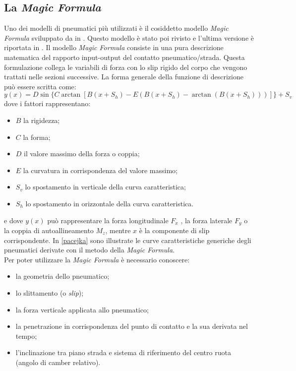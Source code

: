\subsection{La \textit{Magic Formula}}
Uno dei modelli di pneumatici più utilizzati è il cosiddetto modello \textit{Magic Formula} sviluppato da \citeauthor{bakker} in \cite{bakker}. Questo modello è stato poi rivisto e l'ultima versione è riportata in \cite{hans}. Il modello \textit{Magic Formula} consiste in una pura descrizione matematica del rapporto input-output del contatto pneumatico/strada. Questa formulazione collega le variabili di forza con lo slip rigido del corpo che vengono trattati nelle sezioni successive. La forma generale della funzione di descrizione può essere scritta come:
%
\begin{equation}
y(x) = D\sin\{C\arctan[B(x + S_h ) - E(B(x + S_h ) - \arctan(B(x + S_h )))]\} + S_v
\end{equation}
%
dove i fattori rappresentano:
\begin{itemize}
	\item $B$ la rigidezza;
	\item $C$ la forma;
	\item $D$ il valore massimo della forza o coppia;
	\item $E$ la curvatura in corrispondenza del valore massimo;
	\item $S_v$ lo spostamento in verticale della curva caratteristica;
	\item $S_h$ lo spostamento in orizzontale della curva caratteristica.
\end{itemize}
e dove $y(x)$ può rappresentare la forza longitudinale $F_x$ , la forza laterale $F_y$ o la coppia di autoallineamento $M_z$, mentre $x$ è la componente di slip corrispondente. In \figurename{ \ref{pacejka}} sono illustrate le curve caratteristiche generiche degli pneumatici derivate con il metodo della \textit{Magic Formula}.\\
Per poter utilizzare la \textit{Magic Formula} è necessario conoscere:
\begin{itemize}
	\item la geometria dello pneumatico;
	\item lo slittamento (o \textit{slip});
	\item la forza verticale applicata allo pneumatico;
	\item la penetrazione in corrispondenza del punto di contatto e la sua derivata nel tempo;
	\item l'inclinazione tra piano strada e sistema di riferimento del centro ruota (angolo di camber relativo).
\end{itemize}
